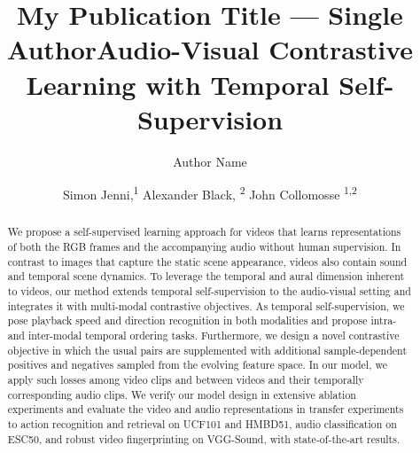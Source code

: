 \documentclass[letterpaper]{article} %
\title{My Publication Title --- Single Author}
\author {
    Author Name
}
\title{Audio-Visual Contrastive Learning with Temporal Self-Supervision} %
\author {
    Simon Jenni,\textsuperscript{\rm 1}
    Alexander Black, \textsuperscript{\rm 2}
    John Collomosse \textsuperscript{\rm 1,\rm 2}
}
\begin{document}
\maketitle

\begin{abstract}
We propose a self-supervised learning approach for videos that learns representations of both the RGB frames and the accompanying audio without human supervision.   
In contrast to images that capture the static scene appearance, videos also contain sound and temporal scene dynamics.  
To leverage the temporal and aural dimension inherent to videos, our method extends temporal self-supervision to the audio-visual setting and integrates it with multi-modal contrastive objectives.
As temporal self-supervision, we pose playback speed and direction recognition in both modalities and propose intra- and inter-modal temporal ordering tasks. 
Furthermore, we design a novel contrastive objective in which the usual pairs are supplemented with additional sample-dependent positives and negatives sampled from the evolving feature space. 
In our model, we apply such losses among video clips and between videos and their temporally corresponding audio clips. 
We verify our model design in extensive ablation experiments and evaluate the video and audio representations in transfer experiments to action recognition and retrieval on UCF101 and HMBD51, audio classification on ESC50, and robust video fingerprinting on VGG-Sound, with state-of-the-art results. 

\end{abstract}
\end{document}
